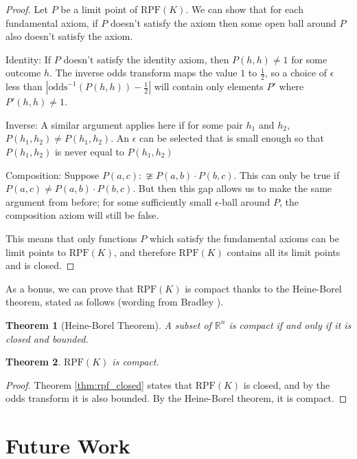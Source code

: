 \documentclass[twoside]{article}
\theoremstyle{plain}%
\newtheorem{theorem}{Theorem}[section]
\theoremstyle{definition}
\theoremstyle{remark}
\begin{document}
\begin{proof}
Let \(P\) be a limit point of \(\text{RPF}(K)\). We can show that for each fundamental axiom, if \(P\) doesn't satisfy the axiom then some open ball around \(P\) also doesn't satisfy the axiom.

Identity: If \(P\) doesn't satisfy the identity axiom, then \(P(h, h) \neq 1\) for some outcome \(h\). The inverse odds transform maps the value \(1\) to \(\frac{1}{2}\), so a choice of \(\epsilon\) less than \(|\text{odds}^{-1}(P(h, h)) - \frac{1}{2}|\) will contain only elements \(P'\) where \(P'(h, h) \neq 1\).

Inverse: A similar argument applies here if for some pair \(h_1\) and \(h_2\), \(P(h_1, h_2) \neq P(h_1, h_2)\). An \(\epsilon\) can be selected that is small enough so that \(P(h_1, h_2)\) is never equal to \(P(h_1, h_2)\)

Composition: Suppose \(P(a, c) :\ncong P(a, b) \cdot P(b, c) \). This can only be true if \(P(a, c) \neq P(a, b) \cdot P(b, c) \). But then this gap allows us to make the same argument from before; for some sufficiently small \(\epsilon\)-ball around \(P\), the composition axiom will still be false.

This means that only functions \(P\) which satisfy the fundamental axioms can be limit points to \(\text{RPF}(K)\), and therefore \(\text{RPF}(K)\) contains all its limit points and is closed.
\end{proof}

As a bonus, we can prove that \(\text{RPF}(K)\) is compact thanks to the Heine-Borel theorem, stated as follows (wording from Bradley \cite{bradley}).

\begin{theorem}[Heine-Borel Theorem]
A subset of \(\mathbb{R}^n\) is compact if and only if it is closed and bounded.
\end{theorem}

\begin{theorem}
\(\text{RPF}(K)\) is compact.
\end{theorem}

\begin{proof}
Theorem \ref{thm:rpf_closed} states that \(\text{RPF}(K)\) is closed, and by the odds transform it is also bounded. By the Heine-Borel theorem, it is compact.
\end{proof}

\section{Future Work}
\label{section:future_work}
\end{document}
